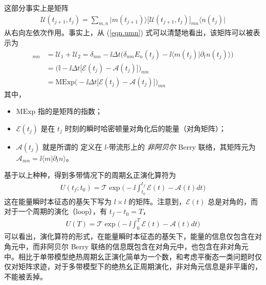 这部分事实上是矩阵
\begin{align}
\mathscr{U}(t_{j+1},t_j)=\sum_{m,n}\bigg|m(t_{j+1})\bigg\rangle \big[\mathscr{U}(t_{j+1},t_j)\big]_{mn} \bigg\langle n(t_j)\bigg|
\end{align}
从右向左依次作用。事实上，从 (\ref{eqn.umn}) 式可以清楚地看出，该矩阵可以被表示为
\begin{align}
[\mathscr{U}(t_{j+1},t_j)]_{mn}&=\mathscr{U}_1+\mathscr{U}_2=\delta_{mn}-\ii\Delta t\bigg(\delta_{mn}E_{n}(t_j)-\ii\langle m(t_j)|\partial_tn(t_j)\rangle\bigg)\\
&=\bigg(\mathbb{I}-\ii\Delta t\Big[\mathcal{E}(t_j)-\mathcal{A}(t_j)\Big]\bigg)_{mn}\\
&= \text{MExp}\bigg(-\ii\Delta t\Big[\mathcal{E}(t_j)-\mathcal{A}(t_j)\Big]\bigg)_{mn}
\end{align}
其中，
\begin{itemize}
\item $\text{MExp}$ 指的是矩阵的指数；
\item $\mathcal{E}(t_j)$ 是在 $t_j$ 时刻的瞬时哈密顿量对角化后的能量（对角矩阵）；
\item $\mathcal{A}(t_j)$ 就是所谓的 定义在 $l$-带流形上的 \textit{非阿贝尔} Berry 联络，其矩阵元为 $\mathcal{A}_{mn}=\ii\langle m|\partial_tn\rangle$。
\end{itemize}

基于以上种种，得到多带情况下的周期幺正演化算符为
\begin{align}
U(t_f;t_0)=\mathcal{T}\exp\bigg(-\ii\int_{t_0}^{t_f}\mathcal{E}(t)-\mathcal{A}(t)dt\bigg)
\end{align}
这在能量瞬时本征态的基矢下写为 $l\times l$ 的矩阵。注意到，$\mathcal{E}(t)$ 总是对角的，而对于一个周期的演化（loop），有 $t_f-t_0=T$，
\begin{align}
U(T)=\mathcal{T}\exp\bigg(-\ii\int_{0}^{T}\mathcal{E}(t)-\mathcal{A}(t)dt\bigg)
\end{align}
可以看出，演化算符的形式，在能量瞬时本征态的基矢下，能量的信息仅包含在对角元中，而非阿贝尔 Berry 联络的信息既包含在对角元中，也包含在非对角元中。相比于单带模型绝热周期幺正演化简单为一个数，和考虑平衡态一类问题时仅仅对矩阵求迹，对于多带模型下的绝热幺正周期演化，非对角元信息是非平庸的，不能被丢掉。






